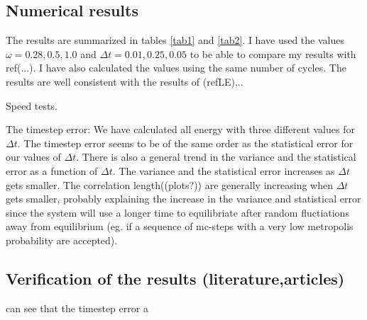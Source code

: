\documentclass[a4paper,10pt,twocolumn]{article} %
\newcommand{\expec}[1]{\langle{}{#1}\rangle{}}
\begin{document}
\subsection{Numerical results}

The results are summarized in tables \ref{tab1} and \ref{tab2}. I have used the values $\omega=0.28,0.5,1.0$ and $\Delta t = 0.01,0.25,0.05$ to be able to compare my 
results with ref(...). I have also calculated the values using the same number of cycles. The results are well consistent with the results of (refLE),..

Speed tests.


The timestep error: We have calculated all energy with three different values for $\Delta t$. 
The timestep error seems to be of the same order as the statistical error for our values of $\Delta t$. 
There is also a general trend in the variance and the statistical error as a function of $\Delta t$. The variance and the statistical error increases as $\Delta t$ gets smaller.
The correlation length((plots?)) are generally increasing when $\Delta t$ gets smaller, probably explaining the increase in the variance and statistical error since the system will use a longer
time to equilibriate after random fluctiations away from equilibrium (eg. if a sequence of mc-steps with a very low metropolis probability are accepted).
%

\subsection{Verification of the results (literature,articles)}



 can see that the timestep error   a 
\end{document}
